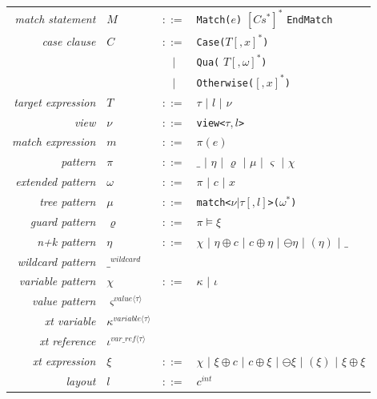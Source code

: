 \documentclass[preprint]{sigplanconf}
\makeatletter
\DeclareRobustCommand{\code}[1]{{\lstinline[breaklines=false,escapechar=@]{#1}}}
\newcommand{\Rule}[1]{{\rmfamily\itshape{#1}}}
\newcommand{\Alt}{\ensuremath{|}}
\newcommand{\is}{$::=$}
\makeatother
\begin{document}
\begin{center}
\begin{tabular}{rp{0em}cl}
\Rule{match statement}     & $M$       & \is{}  & \code{Match(}$e$\code{)} $\left[C s^*\right]^*$ \code{EndMatch} \\
\Rule{case clause}         & $C$       & \is{}  & \code{Case(}$T\left[,x\right]^*$\code{)} \\
                           &           & \Alt{} & \code{Qua(} $T\left[,\omega\right]^*$\code{)} \\
                           &           & \Alt{} & \code{Otherwise(}$\left[,x\right]^*$\code{)} \\
\Rule{target expression}   & $T$       & \is{}  & $\tau$ \Alt{} $l$ \Alt{} $\nu$ \\
\Rule{view}                & $\nu$     & \is{}  & \code{view<}$\tau,l$\code{>} \\
\Rule{match expression}    & $m$       & \is{}  & $\pi(e)$ \\
\Rule{pattern}             & $\pi$     & \is{}  & $\_$ \Alt{} $\eta$ \Alt{} $\varrho$ \Alt{} $\mu$ \Alt{} $\varsigma$ \Alt{} $\chi$ \\
\Rule{extended pattern}    & $\omega$  & \is{}  & $\pi$ \Alt{} $c$ \Alt{} $x$ \\
\Rule{tree pattern}        & $\mu$     & \is{}  & \code{match<}$\nu|\tau\left[,l\right]$\code{>(}$\omega^*$\code{)} \\
\Rule{guard pattern}       & $\varrho$ & \is{}  & $\pi \models \xi$ \\
\Rule{n+k pattern}         & $\eta$    & \is{}  & $\chi$ \Alt{} $\eta \oplus c$ \Alt{} $c \oplus \eta$ \Alt{} $\ominus \eta$ \Alt{} $(\eta)$ \Alt{} $\_$ \\
\Rule{wildcard pattern}    & $\_^{wildcard}$ \\
\Rule{variable pattern}    & $\chi$    & \is{}  & $\kappa$ \Alt{} $\iota$ \\
\Rule{value pattern}       & $\varsigma^{value\langle\tau\rangle}$ \\
\Rule{xt variable}         & $\kappa^{variable\langle\tau\rangle}$ \\
\Rule{xt reference}        & $\iota^{var\_ref\langle\tau\rangle}$  \\
\Rule{xt expression}       & $\xi$     & \is{}  & $\chi$ \Alt{} $\xi \oplus c$ \Alt{} $c \oplus \xi$ \Alt{} $\ominus \xi$ \Alt{} $(\xi)$ \Alt{} $\xi \oplus \xi$ \\
\Rule{layout}              & $l$       & \is{}  & $c^{int}$ \\

\end{tabular}
\end{center}
\end{document}
